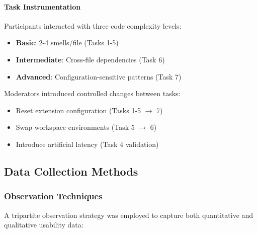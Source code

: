 \documentclass{article}
\begin{document}
\paragraph{Task Instrumentation}
Participants interacted with three code complexity levels:
\begin{itemize}
    \item \textbf{Basic}: 2-4 smells/file (Tasks 1-5)
    \item \textbf{Intermediate}: Cross-file dependencies (Task 6)
    \item \textbf{Advanced}: Configuration-sensitive patterns (Task 7)
\end{itemize}

\noindent Moderators introduced controlled changes between tasks:
\begin{itemize}
    \item Reset extension configuration (Tasks 1-5 $\rightarrow$ 7)
    \item Swap workspace environments (Task 5 $\rightarrow$ 6)
    \item Introduce artificial latency (Task 4 validation)
\end{itemize}

\subsection{Data Collection Methods}
\subsubsection{Observation Techniques}
A tripartite observation strategy was employed to capture both quantitative and qualitative usability data:
\end{document}

